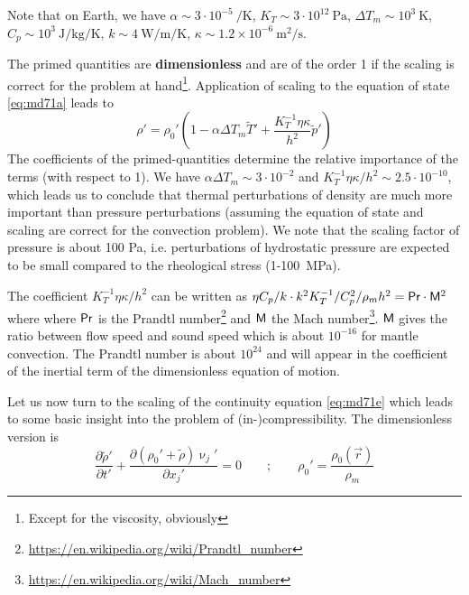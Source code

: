 Note that on Earth, we have
$\alpha \sim 3\cdot 10^{-5}~\si{\per\kelvin}$,
$K_T \sim 3\cdot 10^{12}~\si{\pascal}$,
$\Delta T_m \sim 10^3~\si{\kelvin}$,
$C_p \sim 10^3~\si{\joule\per\kg\per\kelvin}$,
$k\sim 4~\si{\watt\per\meter\per\kelvin}$,
$\kappa \sim 1.2\times 10^{-6}~\si{\square\meter\per\second}$.

The primed quantities are {\bf dimensionless} and are of the order 1 if the scaling is correct for
the problem at hand\footnote{Except for the viscosity, obviously}.
Application of scaling to the equation of state \eqref{eq:md71a} leads to
\begin{equation}
\rho' = \rho_0' \left(  1 - \alpha \Delta T_m {\tilde T}' + 
\frac{K_T^{-1}\eta \kappa }{h^2} {\tilde p}' \right)
\label{eq:md72}
\end{equation}
The coefficients of the primed-quantities determine the relative importance of the terms
(with respect to 1). We have 
$\alpha \Delta T_m \sim 3\cdot 10^{-2}$ and $K_T^{-1}\eta \kappa/h^2 \sim 2.5\cdot 10^{-10}$,
which leads us to conclude that
thermal perturbations of density are much more important than pressure perturbations
(assuming the equation of state and scaling are correct for the convection problem). We
note that the scaling factor of pressure is about 100 Pa, i.e. perturbations of hydrostatic
pressure are expected to be small compared to the rheological stress (1-100~\si{\mega\pascal}).

The coefficient $K_T^{-1}\eta \kappa/h^2$ can be written as 
$\eta C_p/k \cdot k^2 K_T^{-1}/C_p^2/\rho_m h^2 = {\mathsf{Pr}} \cdot {\mathsf{M}}^2$
where where ${\mathsf{Pr}}$ is the
Prandtl number\footnote{\url{https://en.wikipedia.org/wiki/Prandtl_number}} 
and ${\mathsf{M}}$ the Mach number\footnote{\url{https://en.wikipedia.org/wiki/Mach_number}}. 
${\mathsf{M}}$ gives the ratio between flow speed and
sound speed which is about $10^{-16}$ for mantle convection. The Prandtl number is about $10^{24}$
and will appear in the coefficient of the inertial term of the dimensionless equation of
motion.

Let us now turn to the scaling of the continuity equation \eqref{eq:md71e} which leads to some 
basic insight into the problem of (in-)compressibility. The dimensionless version is
\begin{equation}
\frac{\partial {\tilde \rho}'}{\partial t'} + 
\frac{\partial (\rho_0' + {\tilde \rho})\upnu_j'  }{\partial x_j'} = 0
\qquad
; \qquad
\rho_0' = \frac{\rho_0(\vec{r})}{\rho_m}
\label{eq:md73a}
\end{equation}

